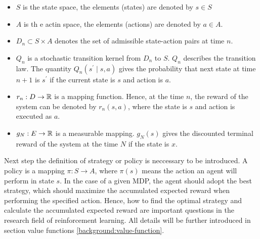 \begin{itemize}
\item $S$ is the state space, the elements (states) are denoted by $s \in S$
\item $A$ is th e actin space, the elements (actions) are denoted by $a \in A$.
\item $D_{n} \subset S \times A$ denotes the set of admissible state-action pairs at time $n$.
\item $Q_n$ is a stochastic transition kernel from $D_n$ to $S$. $Q_n$ describes the transition law. The quantity $Q_n(s^{\prime} \mid s, a)$ gives the probability that next state at time $n+1$ is $s^{\prime}$ if the current state is $s$ and action is $a$.
\item $r_n: D \rightarrow \mathbb{R}$ is a mapping function. Hence, at the time $n$, the reward of the system can be denoted by $r_n(s, a)$, where the state is $s$ and action is executed as $a$.
\item $g_N: E \rightarrow \mathbb{R}$ is a measurable mapping. $g_N(s)$ gives the discounted terminal reward of the system at the time $N$ if the state is $x$. 
\end{itemize}

Next step the definition of strategy or policy is neccessary to be introduced. A policy is a mapping $\pi: S \rightarrow A$, where $\pi(s)$ means the action an agent will perform in state $s$. In the case of a given MDP, the agent should adopt the best strategy, which should maximize the accumulated expected reward when performing the specified action. Hence, how to find the optimal strategy and calculate the accumulated expected reward are important questions in the research field of reinforcement learning. All details will be further introduced in section value functions \ref{background:value-function}.

